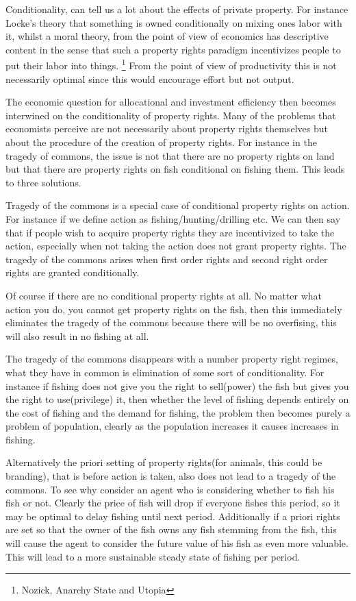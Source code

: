 \documentclass[12pt]{article}
\numberwithin{equation}{section}
\begin{document}
Conditionality, can tell us a lot about the effects of private property. For instance Locke's theory that something is owned conditionally on mixing ones labor with it, whilst a moral theory, from the point of view of economics has descriptive content in the sense that such a property rights paradigm incentivizes people to put their labor into things. \footnote{Nozick, Anarchy State and Utopia} From the point of view of productivity this is not necessarily optimal since this would encourage effort but not output. 

The economic question for allocational and investment efficiency then becomes interwined on the conditionality of property rights. Many of the problems that economists perceive are not necessarily about property rights themselves but about the procedure of the creation of property rights. For instance in the tragedy of commons, the issue is not that there are no property rights on land but that there are property rights on fish conditional on fishing them. This leads to three solutions. 

Tragedy of the commons is a special case of conditional property rights on action. For instance if we define action as fishing/hunting/drilling etc. We can then say that if people wish to acquire property rights they are incentivized to take the action, especially when not taking the action does not grant property rights. The tragedy of the commons arises when first order rights and second right order rights are granted conditionally. 

Of course if there are no conditional property rights at all. No matter what action you do, you cannot get property rights on the fish, then this immediately eliminates the tragedy of the commons because there will be no overfising, this will also result in no fishing at all. 

The tragedy of the commons disappears with a number property right regimes, what they have in common is elimination of some sort of conditionality. For instance if fishing does not give you the right to sell(power) the fish but gives you the right to use(privilege) it, then whether the level of fishing depends entirely on the cost of fishing and the demand for fishing, the problem then becomes purely a problem of population, clearly as the population increases it causes increases in fishing. 

Alternatively the priori setting of property rights(for animals, this could be branding), that is before action is taken, also does not lead to a tragedy of the commons. To see why consider an agent who is considering whether to fish his fish or not. Clearly the price of fish will drop if everyone fishes this period, so it may be optimal to delay fishing until next period. Additionally if a priori rights are set so that the owner of the fish owns any fish stemming from the fish, this will cause the agent to consider the future value of his fish as even more valuable. This will lead to a more sustainable steady state of fishing per period. 
\end{document}
